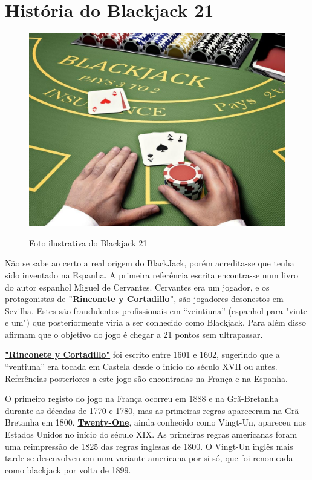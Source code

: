 \documentclass{report}
\begin{document}
\chapter{História do Blackjack 21}
\label{chap.História do BlackJack 21}
\begin{figure}[H]
\centering
\includegraphics[scale=0.25]{fotos/bl.jpg}
\caption{Foto ilustrativa do Blackjack 21}\cite{blackcapa} %
\end{figure}
Não se sabe ao certo a real origem do BlackJack, porém acredita-se que tenha sido inventado na Espanha. A primeira referência escrita encontra-se num livro do autor espanhol Miguel de Cervantes. Cervantes era um jogador, e os protagonistas de \hyperlink{Glossário}{\textbf{"Rinconete y Cortadillo"}}, são jogadores desonestos em Sevilha. Estes são fraudulentos profissionais em “veintiuna” (espanhol para "vinte e um") que posteriormente viria a ser conhecido como Blackjack. Para além disso afirmam que o objetivo do jogo é chegar a 21 pontos sem ultrapassar.

\hyperlink{Glossário}{\textbf{"Rinconete y Cortadillo"}} foi escrito entre 1601 e 1602, sugerindo que a “ventiuna” era tocada em Castela desde o início do século XVII ou antes. Referências posteriores a este jogo são encontradas na França e na Espanha.
 
O primeiro registo do jogo na França ocorreu em 1888 e na Grã-Bretanha durante as décadas de 1770 e 1780, mas as primeiras regras apareceram na Grã-Bretanha em 1800. \hyperlink{Glossário}{\textbf{Twenty-One}}, ainda conhecido como Vingt-Un, apareceu nos Estados Unidos no início do século XIX. As primeiras regras americanas foram uma reimpressão de 1825 das regras inglesas de 1800. O Vingt-Un inglês mais tarde se desenvolveu em uma variante americana por si só, que foi renomeada como blackjack por volta de 1899.
 
\end{document}
